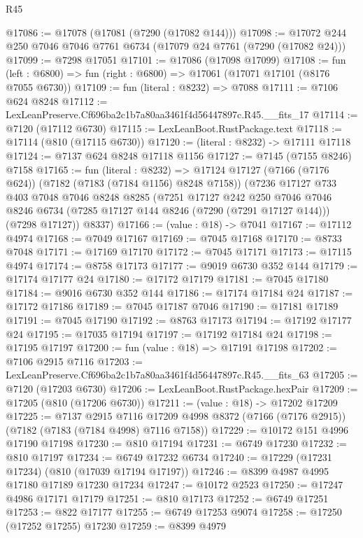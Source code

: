 \begin{lexlean}{R45}
\begin{coremodule}
{@17086 := @17078 (@17081 (@7290 (@17082 @144)))
@17098 := @17072 @244 @250 @7046 @7046 @7761 @6734 (@17079 @24 @7761 (@7290 (@17082 @24)))
@17099 := @7298 @17051
@17101 := @17086 (@17098 @17099)
@17108 := fun (left : @6800) => fun (right : @6800) => @17061 (@17071 @17101 (@8176 @7055 @6730))
@17109 := fun (literal : @8232) => @7088
@17111 := @7106 @624 @8248
@17112 := LexLeanPreserve.Cf696ba2c1b7a80aa3461f4d56447897c.R45.__fits_17
@17114 := @7120 (@17112 @6730)
@17115 := LexLeanBoot.RustPackage.text
@17118 := @17114 (@810 (@17115 @6730))
@17120 := (literal : @8232) -> @17111 @17118
@17124 := @7137 @624 @8248 @17118 @1156
@17127 := @7145 (@7155 @8246) @7158
@17165 := fun (literal : @8232) =>
  @17124
    @17127
    (@7166 (@7176 @624))
    (@7182 (@7183 (@7184 @1156) @8248 @7158))
    (@7236
      @17127
      @733
      @403
      @7048
      @7046
      @8248
      @8285
      (@7251
        @17127
        @242
        @250
        @7046
        @7046
        @8246
        @6734
        (@7285 @17127 @144 @8246 (@7290 (@7291 @17127 @144)))
        (@7298 @17127))
      @8337)
@17166 := (value : @18) -> @7041
@17167 := @17112 @4974
@17168 := @7049 @17167
@17169 := @7045 @17168
@17170 := @8733 @7048
@17171 := @17169 @17170
@17172 := @7045 @17171
@17173 := @17115 @4974
@17174 := @8758 @17173
@17177 := @9019 @6730 @352 @144
@17179 := @17174 @17177 @24
@17180 := @17172 @17179
@17181 := @7045 @17180
@17184 := @9016 @6730 @352 @144
@17186 := @17174 @17184 @24
@17187 := @17172 @17186
@17189 := @7045 @17187 @7046
@17190 := @17181 @17189
@17191 := @7045 @17190
@17192 := @8763 @17173
@17194 := @17192 @17177 @24
@17195 := @17035 @17194
@17197 := @17192 @17184 @24
@17198 := @17195 @17197
@17200 := fun (value : @18) => @17191 @17198
@17202 := @7106 @2915 @7116
@17203 := LexLeanPreserve.Cf696ba2c1b7a80aa3461f4d56447897c.R45.__fits_63
@17205 := @7120 (@17203 @6730)
@17206 := LexLeanBoot.RustPackage.hexPair
@17209 := @17205 (@810 (@17206 @6730))
@17211 := (value : @18) -> @17202 @17209
@17225 := @7137
    @2915
    @7116
    @17209
    @4998
    @8372
    (@7166 (@7176 @2915))
    (@7182 (@7183 (@7184 @4998) @7116 @7158))
@17229 := @10172 @151 @4996 @17190 @17198
@17230 := @810 @17194
@17231 := @6749 @17230
@17232 := @810 @17197
@17234 := @6749 @17232 @6734
@17240 := @17229 (@17231 @17234) (@810 (@17039 @17194 @17197))
@17246 := @8399 @4987 @4995 @17180 @17189 @17230 @17234
@17247 := @10172 @2523
@17250 := @17247 @4986 @17171 @17179
@17251 := @810 @17173
@17252 := @6749 @17251
@17253 := @822 @17177
@17255 := @6749 @17253 @9074
@17258 := @17250 (@17252 @17255) @17230
@17259 := @8399 @4979
}
\end{coremodule}
\end{lexlean}
